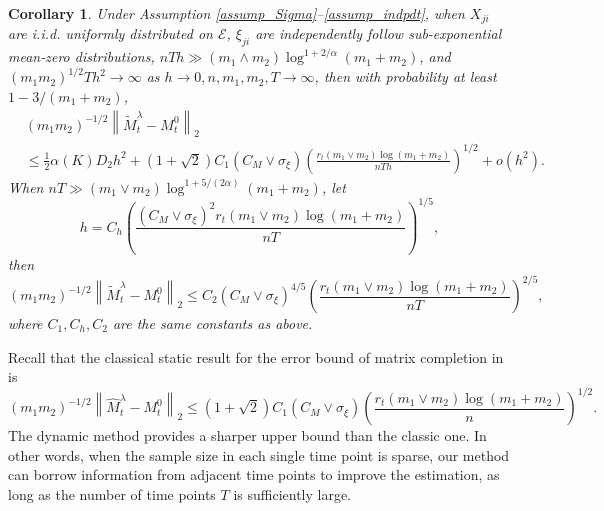\documentclass[12pt]{article}
\newtheorem{cor}{Corollary}
\begin{document}
  \begin{cor}
  \label{cor_matrix_completion}
  Under Assumption \ref{assump_Sigma}--\ref{assump_indpdt}, when $X_{ji}$ are i.i.d. uniformly distributed on $\mathcal{E}$, $\xi_{ji}$ are independently follow sub-exponential mean-zero distributions, $n T h \gg (m_1\wedge m_2)\log^{1+2/\alpha} (m_1+m_2)$, and $(m_1m_2)^{1/2}Th^2\rightarrow\infty$ as $h\rightarrow 0,n,m_1,m_2,T\rightarrow\infty$,
  then with probability at least $1-3/(m_1+m_2)$,
  \begin{align*}
  &(m_1m_2)^{-1/2}\left\|\widetilde{M}_t^\lambda - M_t^0\right\|_2 \\&\le
  \frac{1}{2}\alpha(K)D_2h^2+
  (1+\sqrt{2})C_1 (C_M\vee \sigma_\xi)\left(\frac{r_t(m_1\vee m_2)\log (m_1+m_2)}{n Th}\right)^{1/2}+o(h^2).
  \end{align*}
  When $nT\gg(m_1\vee m_2)\log^{1+5/(2\alpha)}(m_1+m_2)$, let
  \begin{equation}
  \label{eq_select_h}
  h=C_{h}\left(\frac{(C_M\vee \sigma_\xi)^2r_t(m_1\vee m_2)\log(m_1+m_2)}{n T}\right)^{1/5},
  \end{equation}
  then
  \begin{equation}\label{eq_upper_bound_mc}
  (m_1m_2)^{-1/2}\left\|\widetilde{M}_t^\lambda - M_t^0\right\|_2 \le C_2(C_M\vee \sigma_\xi)^{4/5}\left(\frac{r_t(m_1\vee m_2)\log(m_1+m_2)}{n T}\right)^{2/5},
  \end{equation}
  where $C_1,C_h,C_2$ are the same constants as above.
  \end{cor}
  
  Recall that the classical static result for the error bound of matrix completion in \cite{koltchinskii_nuclear-norm_2011} is
  $$(m_1m_2)^{-1/2}\left\|\widehat{M}_t^\lambda-M_t^0\right\|_2\le (1+\sqrt{2})C_1(C_M\vee \sigma_\xi)\left(\frac{r_t(m_1\vee m_2)\log(m_1+m_2)}{n}\right)^{1/2}.$$
  The dynamic method provides a sharper upper bound than the classic one. In other words, when the sample size in each single time point is sparse, our method can borrow information from adjacent time points to improve the estimation, as long as the number of time points $T$ is sufficiently large.
  

\end{document}
